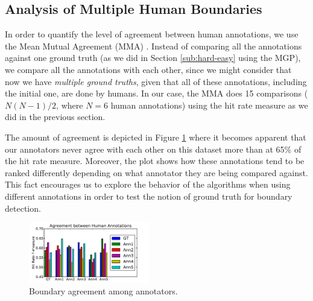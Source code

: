\documentclass{article}
\begin{document}






\subsection{Analysis of Multiple Human Boundaries}

In order to quantify the level of agreement between human annotations, we use the Mean Mutual Agreement (MMA) \cite{Holzapfel2012}.
Instead of comparing all the annotations against one ground truth (as we did in Section \ref{sub:hard-easy} using the MGP), we compare all the annotations with each other, since we might consider that now we have \textit{multiple ground truths}, given that all of these annotations, including the initial one, are done by humans.
In our case, the MMA does 15 comparisons ($N(N-1)/2$, where $N=6$ human annotations) using the hit rate measure as we did in the previous section.

The amount of agreement is depicted in Figure \ref{fig:human-agreement} where it becomes apparent that our annotators never agree with each other on this dataset more than at 65\% of the hit rate measure.
Moreover, the plot shows how these annotations tend to be ranked differently depending on what annotator they are being compared against.
This fact encourages us to explore the behavior of the algorithms when using different annotations in order to test the notion of ground truth for boundary detection.

\begin{figure}
  \centering
  \includegraphics[width=0.47\textwidth]{plots/human-agreement.pdf}
  \caption{Boundary agreement among annotators.}
  \label{fig:human-agreement}
\end{figure}%
\end{document}
